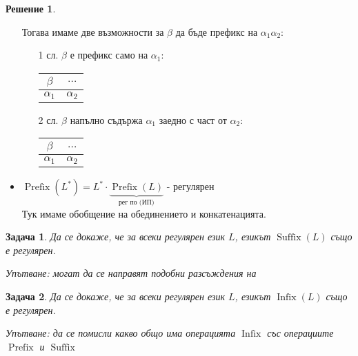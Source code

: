 \documentclass{article}
\newtheorem{problem}{Задача}[section]
\theoremstyle{definition}
\newtheorem*{solution}{Решение}
\begin{document}
\begin{solution}
\begin{itemize}
              Тогава имаме две възможности за $\beta$ да бъде префикс на $\alpha_1 \alpha_2$:
              \begin{itemize}
                  \item[1 сл.] $\beta$ е префикс само на $\alpha_1$: \\
                      \begin{tabular}{|c|c|c|c|}
                          \hline
                          $\beta$                                           & \multicolumn{3}{|m{1.5cm}|}{\phantom{00}$\dots$} \\ \hline
                          \multicolumn{2}{|m{1cm}|}{\phantom{00}$\alpha_1$} & \multicolumn{2}{m{1cm}|}{\phantom{00}$\alpha_2$} \\ \hline
                      \end{tabular}
                  \item[2 сл.] $\beta$ напълно съдържа $\alpha_1$ заедно с част от $\alpha_2$: \\
                      \begin{tabular}{|c|c|c|c|}
                          \hline
                          \multicolumn{3}{|m{1.5cm}|}{\phantom{0000}$\beta$} & $\dots$                                          \\ \hline
                          \multicolumn{2}{|m{1cm}|}{\phantom{00}$\alpha_1$}  & \multicolumn{2}{m{1cm}|}{\phantom{00}$\alpha_2$} \\ \hline
                      \end{tabular}
              \end{itemize}
        \item $\operatorname{Prefix}(L^*) = L^* \cdot \underbrace{\operatorname{Prefix}(L)}_{\text{рег по (ИП)}}$ - регулярен \\
              Тук имаме обобщение на обединението и конкатенацията.
    \end{itemize}
\end{solution}

\begin{problem}
Да се докаже, че за всеки регулярен език $L$, езикът $\operatorname{Suffix}(L)$ също е регулярен.

Упътване: могат да се направят подобни разсъждения на 
\end{problem}

\begin{problem}
Да се докаже, че за всеки регулярен език $L$, езикът $\operatorname{Infix}(L)$ също е регулярен.

Упътване: да се помисли какво общо има операцията $\operatorname{Infix}$ със операциите $\operatorname{Prefix}$ и $\operatorname{Suffix}$
\end{problem}
\end{document}
